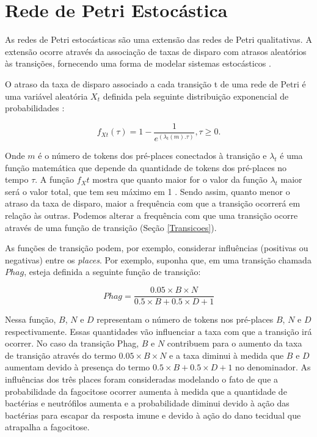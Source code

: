 \documentclass[a4paper,10pt]{article}
\begin{document}
	\section{Rede de Petri Estocástica}\label{Secao_redeestocastica}
	
		As redes de Petri estocásticas são uma extensão das redes de Petri qualitativas. A extensão
		ocorre através da associação de taxas de disparo com atrasos aleatórios às transições, fornecendo uma
		forma de modelar sistemas estocásticos \cite{Liu2012,Heiner2010petri}. 
		
		O atraso da taxa de disparo associado a cada transição t de uma rede de Petri é uma variável
		aleatória $X_t$ definida pela seguinte distribuição exponencial de probabilidades \cite{Liu2013SPNC}: 
	
		\begin{equation}
			f_{Xt}(\tau) = 1 - \frac{1}{e^{(\lambda_t(m).\tau)}}, \tau \geq 0.  
			\label{fatrasoTaxaDisparo}
		\end{equation}
		\vspace{0.5cm}
		
		Onde $m$ é o número de tokens dos pré-places conectados à transição e $\lambda_t$ é uma função matemática que
		depende da quantidade de tokens dos pré-places no tempo $\tau$. A função $f_Xt$ mostra que quanto maior for o valor
		da função $\lambda_t$ maior será o valor total, que tem seu máximo em 1 \cite{Liu2013SPNC}.
		Sendo assim, quanto menor o atraso da taxa de disparo, maior a frequência com que a transição ocorrerá em relação às outras. 
		Podemos alterar a frequência com que uma transição ocorre através de uma função de transição (Seção \ref{Transicoes}). 
		
		As funções de transição podem, por exemplo, considerar influências (positivas ou negativas) entre os \textit{places}. 
		Por exemplo, suponha que, em uma transição chamada $Phag$, esteja definida a seguinte função de transição:
		
		\begin{equation}
			{Phag}= \frac{0.05 \times B \times N}{0.5 \times B + 0.5 \times D + 1}
		\end{equation}
		
		Nessa função, $B$, $N$ e $D$ representam o número de tokens nos pré-places $B$, $N$ e $D$ respectivamente. 
		Essas quantidades vão influenciar a taxa com que a transição irá ocorrer. No caso da transição Phag, $B$ e $N$ 
		contribuem para o aumento da taxa de transição através do termo $0.05 \times B \times N$ e a taxa diminui à medida que 
		$B$ e $D$ aumentam devido à presença do termo $0.5 \times B + 0.5 \times D + 1$ no denominador. 
		As influências dos três places foram consideradas modelando o fato de que a probabilidade da fagocitose 
		ocorrer aumenta à medida que a quantidade de bactérias e neutrófilos aumenta e a probabilidade diminui devido à ação das bactérias 
		para escapar da resposta imune e devido à ação do dano tecidual que atrapalha a fagocitose.
		
\end{document}
